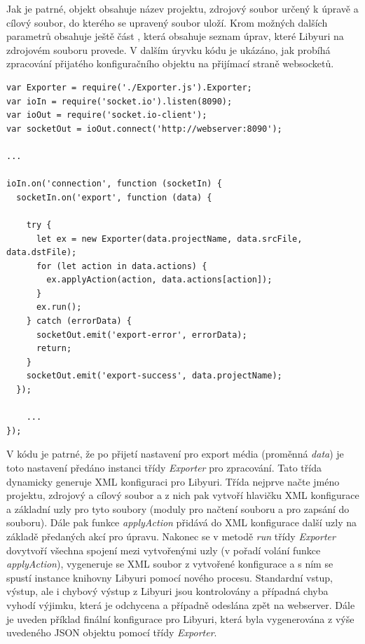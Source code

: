 \documentclass[thesis=M,czech]{FITthesis}[2012/06/26]
\begin{document}
Jak je patrné, objekt obsahuje název projektu, zdrojový soubor určený k úpravě a cílový soubor, do kterého se upravený soubor uloží. Krom možných dalších parametrů obsahuje ještě část , která obsahuje seznam úprav, které Libyuri na zdrojovém souboru provede. V dalším úryvku kódu je ukázáno, jak probíhá zpracování přijatého konfiguračního objektu na přijímací straně websocketů.\\

\begin{lstlisting}[style=htmlcssjs]
var Exporter = require('./Exporter.js').Exporter;
var ioIn = require('socket.io').listen(8090);
var ioOut = require('socket.io-client');
var socketOut = ioOut.connect('http://webserver:8090');

...

ioIn.on('connection', function (socketIn) {
  socketIn.on('export', function (data) {

    try {
      let ex = new Exporter(data.projectName, data.srcFile, data.dstFile);
      for (let action in data.actions) {
        ex.applyAction(action, data.actions[action]);
      }
      ex.run();
    } catch (errorData) {
      socketOut.emit('export-error', errorData);
      return;
    }
    socketOut.emit('export-success', data.projectName);
  });
  
	...
});
\end{lstlisting}

V kódu je patrné, že po přijetí nastavení pro export média (proměnná \textit{data}) je toto nastavení předáno instanci třídy \textit{Exporter} pro zpracování. Tato třída dynamicky generuje XML konfiguraci pro Libyuri. Třída nejprve načte jméno projektu, zdrojový a cílový soubor a z nich pak vytvoří hlavičku XML konfigurace a základní uzly pro tyto soubory (moduly  pro načtení souboru a  pro zapsání do souboru). Dále pak funkce \textit{applyAction} přidává do XML konfigurace další uzly na základě předaných akcí pro úpravu. Nakonec se v metodě \textit{run} třídy \textit{Exporter} dovytvoří všechna spojení mezi vytvořenými uzly (v pořadí volání funkce \textit{applyAction}), vygeneruje se XML soubor z vytvořené konfigurace a s ním se spustí instance knihovny Libyuri pomocí nového procesu. Standardní vstup, výstup, ale i chybový výstup z Libyuri jsou kontrolovány a případná chyba vyhodí výjimku, která je odchycena a případně odeslána zpět na webserver. Dále je uveden příklad finální konfigurace pro Libyuri, která byla vygenerována z výše uvedeného JSON objektu pomocí třídy \textit{Exporter}.\\
\end{document}
